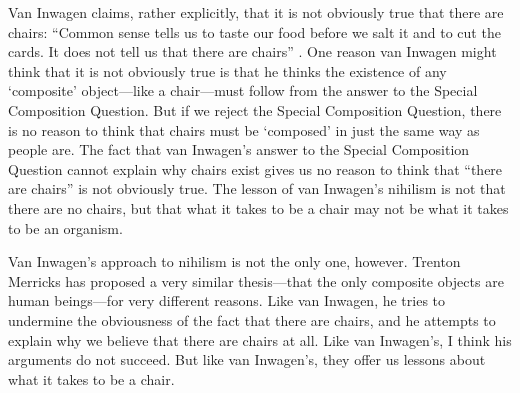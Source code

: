 \documentclass[11pt]{article}
\begin{document}
\begin{spacing}{1.5}
Van Inwagen claims, rather explicitly, that it is not obviously true
that there are chairs: ``Common sense tells us to taste our food
before we salt it and to cut the cards.  It does not tell us that
there are chairs'' \citeyearpar[103]{inwagen1995}.  One reason van
Inwagen might think that it is not obviously true is that he thinks
the existence of any `composite' object---like a chair---must follow
from the answer to the Special Composition Question.  But if we reject
the Special Composition Question, there is no reason to think that
chairs must be `composed' in just the same way as people are.  The
fact that van Inwagen's answer to the Special Composition Question
cannot explain why chairs exist gives us no reason to think that
``there are chairs'' is not obviously true.  The lesson of van
Inwagen's nihilism is not that there are no chairs, but that what it
takes to be a chair may not be what it takes to be an organism.

Van Inwagen's approach to nihilism is not the only one, however.
Trenton Merricks has proposed a very similar thesis---that the only
composite objects are human beings---for very different reasons.  Like
van Inwagen, he tries to undermine the obviousness of the fact that
there are chairs, and he attempts to explain why we believe that there
are chairs at all.  Like van Inwagen's, I think his arguments do not
succeed.  But like van Inwagen's, they offer us lessons about what it
takes to be a chair.

\ifstandalone
\end{spacing}


\fi
\end{document}
